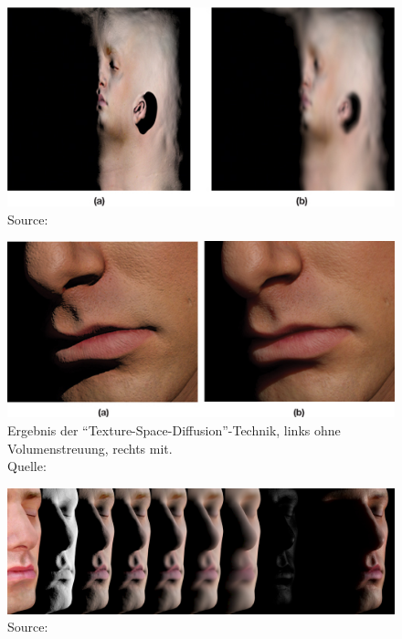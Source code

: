\documentclass[ngerman,runningheads,a4paper]{llncs}[2018/03/10]
\begin{document}
\begin{figure}
  \centering
  \includegraphics[scale=0.9,keepaspectratio]{./images/irradiance-texture-adrian.jpg}
  \caption{Source: \citet{efficient-human-skin-rendering}}
\end{figure}

\begin{figure}
  \centering
  \includegraphics[scale=0.9,keepaspectratio]{./images/skin-rendering-with-without-sss.jpg}
  \caption{Ergebnis der \enquote{Texture-Space-Diffusion}-Technik, links ohne Volumenstreuung, rechts mit.\\\hspace{\textwidth}Quelle: \citet{efficient-human-skin-rendering}}
  \label{fig:outlook-final-result-no-sss}
\end{figure}

\begin{figure}
  \centering
  \includegraphics[scale=0.4,keepaspectratio]{./images/human-skin-final-rendering.jpg}
  \caption{Source: \citet{efficient-human-skin-rendering}}
\end{figure}
\end{document}
